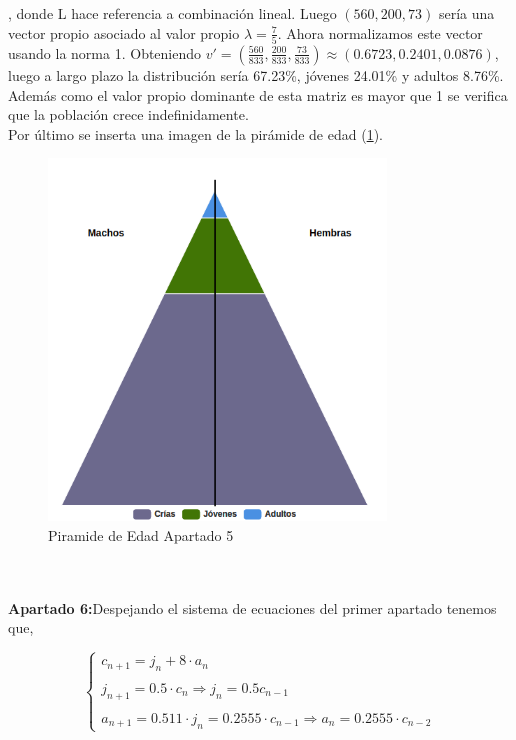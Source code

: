 \documentclass{article}
\begin{document}
, donde L hace referencia a combinación lineal. Luego $(560,200,73)$ sería una vector propio asociado al valor propio $\lambda =\frac{7}{5}$. Ahora normalizamos este vector usando la norma 1. Obteniendo $v'=(\frac{560}{833},\frac{200}{833},\frac{73}{833}) \approx (0.6723,0.2401,0.0876)$, luego a largo plazo la distribución sería 67.23\%, jóvenes 24.01\% y adultos 8.76\%. Además como el valor propio dominante de esta matriz es mayor que 1 se verifica que la población crece indefinidamente. \\

Por último se inserta una imagen de la pirámide de edad (\ref{pirámide}). 
\begin{figure}[h]
\caption{Piramide de Edad Apartado 5}
\label{pirámide}
\centering
\includegraphics[width=0.8\textwidth, scale=1]{piramide.png}
\end{figure}
\\ \\

\textbf{Apartado 6:}Despejando el sistema de ecuaciones del primer apartado tenemos que,

\begin{equation*}
\left\{ \begin{array}{lcc}
             c_{n+1} = j_n + 8\cdot a_n \\
             \\ j_{n+1} = 0.5\cdot c_n \Rightarrow j_n = 0.5c_{n-1} \\
             \\ a_{n+1} = 0.511\cdot j_n = 0.2555\cdot c_{n-1} \Rightarrow a_n = 0.2555\cdot c_{n-2}
             \end{array}
   \right.
\end{equation*}
\end{document}

